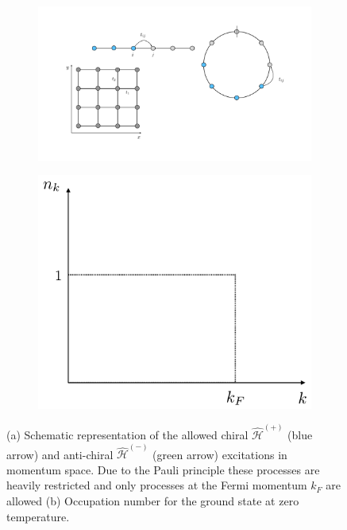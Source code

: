 \documentclass[11pt, a4paper, oneside]{book}
\theoremstyle{definition} %
\begin{document}
\begin{figure}
\centering
\begin{subfigure}[t]{0.4\textwidth}
	\centering
	\includegraphics[width =\textwidth]{SSD_Construction}
	\caption{}
\end{subfigure}
\begin{subfigure}[t]{0.4\textwidth}
	\centering
	\includegraphics[width =\textwidth]{Disperion_relation1D}
	\caption{}
	\label{Fermi-Dirac-DistributionT=0}
\end{subfigure}
\caption{(a) Schematic representation of the allowed chiral $\hat{\mathcal{H}}^{(+)}$ (blue arrow) and anti-chiral $\hat{\mathcal{H}}^{(-)}$ (green arrow) excitations in momentum space. Due to the Pauli principle these processes are heavily restricted and only processes at the Fermi momentum $k_F$ are allowed (b) Occupation number for the ground state at zero temperature.}
\label{fig:dispersion_relation1D}
\end{figure}
\end{document}
